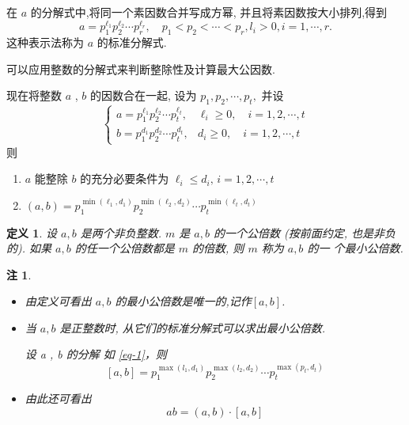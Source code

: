 \documentclass[11pt,punct]{ctexbeamer}
\newtheorem*{defi}{定义}
\newtheorem*{rem}{注}
\begin{document}
\begin{frame}
在 $a$ 的分解式中,将同一个素因数合并写成方幂, 并且将素因数按大小排列,得到
\[
a=p_{1}^{\ell_{1}} p_{2}^{\ell_{2}} \cdots p_{r}^{\ell_r},  \quad p_{1}<p_{2}<\cdots<p_{r}, l_{i}>0, i=1, \cdots, r.
\]
这种表示法称为 $a$ 的\alert{标准分解式}.

可以应用整数的分解式来判断整除性及计算最大公因数.

现在将整数 $a$ , $b$ 的因数合在一起, 设为 $p_{1}, p_{2}, \cdots, p_{t},$ 并设
\begin{equation}\label{eq-1}
\left\{\begin{array}{ll}
a=p_{1}^{\ell_{1}} p_{2}^{\ell_{2}} \cdots p_{t}^{\ell_t}, & \ell_{i} \geqslant 0,  \quad i=1,2, \cdots, t \\
b=p_{1}^{d_{1}} p_{2}^{d_{2}} \cdots p_{t}^{d_t}, & d_{i} \geqslant 0,  \quad i=1,2, \cdots, t
\end{array}\right.
\end{equation}
则
\begin{enumerate}
\item $a$ 能整除 $b$ 的充分必要条件为
$
\ell_{i} \leqslant d_{i},\,  i=1,2, \cdots, t
$
\item
$
(a, b)=p_{1}^{\min \left(\ell_{1}, d_{1}\right)} p_{2}^{\min \left(\ell_{2}, d_{2}\right)}\cdots p_{t}^{\min \left(\ell_{t}, d_{t}\right)}
$
\end{enumerate}

\end{frame}



\begin{frame}

\begin{defi}
设 $a ,b$ 是两个非负整数. $m$ 是 $a, b$ 的一个公倍数  (按前面约定, 也是非负的).
如果 $a , b$ 的任一个公倍数都是 $m$ 的倍数, 则 $m$ 称为 $a, b$ 的一 个\alert{最小公倍数}.
\end{defi}
\begin{rem}
\begin{itemize}
\item 由定义可看出 $a ,b$ 的最小公倍数是唯一的,记作$[a, b]$.
\item 当 $a, b$ 是正整数时, 从它们的标准分解式可以求出最小公倍数.

设 a , b 的分解 如 \eqref{eq-1}，则
\[
[a, b]=p_{1}^{\max \left(l_{1}, d_{1}\right)} p_{2}^{\max \left(l_{2}, d_{2}\right)} \cdots p_{t}^{\max \left(p_{t}, d_{t}\right)}
\]
\item 由此还可看出
\[
a  b=(a, b) \cdot[a, b]
\]
\end{itemize}
\end{rem}

\end{frame}
\end{document}
